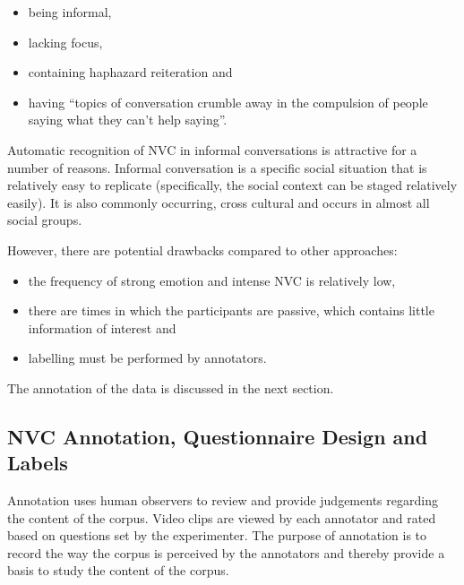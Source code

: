 \begin{itemize}
 \item being informal,
 \item lacking focus,
 \item containing haphazard reiteration and
 \item having ``topics of conversation crumble away in the compulsion of people saying what they can't help saying''.
\end{itemize}

Automatic recognition of \ac{NVC} in informal conversations is attractive for a number of reasons. Informal conversation is a specific social situation that is relatively easy to replicate (specifically, the social context can be staged relatively easily). It is also commonly occurring, cross cultural and occurs in almost all social groups.

However, there are potential drawbacks compared to other approaches:

\begin{itemize}
 \item the frequency of strong emotion and intense \ac{NVC} is relatively low,
 \item there are times in which the participants are passive, which contains little information of interest and
 \item labelling must be performed by annotators.
\end{itemize}

The annotation of the data is discussed in the next section.

\subsection{NVC Annotation, Questionnaire Design and Labels}
\label{BackgroundWhyNvcAnnotationIsBoring}
\label{BackgroundMultipleAnnotation}
\label{BackgroundQuestionaireDesign}

Annotation uses human observers to review and provide judgements regarding the content of the corpus. Video clips are viewed by each annotator and rated based on questions set by the experimenter. The purpose of annotation is to record the way the corpus is perceived by the annotators and thereby provide a basis to study the content of the corpus.



